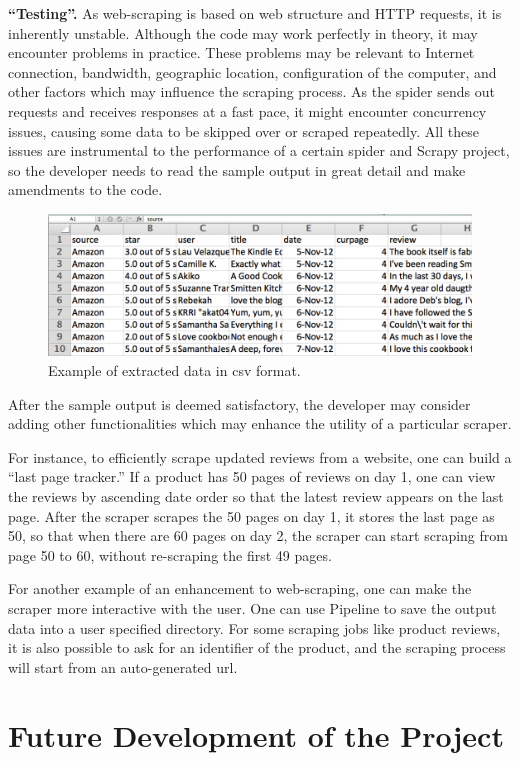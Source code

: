 \documentclass[12pt]{report}
\begin{document}
\textbf{``Testing''.} As web-scraping is based on web structure and HTTP requests, it is inherently unstable. Although the code may work perfectly in theory, it may encounter problems in practice. These problems may be relevant to Internet connection, bandwidth, geographic location, configuration of the computer, and other factors which may influence the scraping process. As the spider sends out requests and receives responses at a fast pace, it might encounter concurrency issues, causing some data to be skipped over or scraped repeatedly. All these issues are instrumental to the performance of a certain spider and Scrapy project, so the developer needs to read the sample output in great detail and make amendments to the code.
\begin{figure}[htp]
\includegraphics[width=\textwidth]{sample_output.png}
\caption[Sample csv output]
{Example of extracted data in csv format.}
\end{figure}

After the sample output is deemed satisfactory, the developer may consider adding other functionalities which may enhance the utility of a particular scraper. 

For instance, to efficiently scrape updated reviews from a website, one can build a ``last page tracker.'' If a product has 50 pages of reviews on day 1, one can view the reviews by ascending date order so that the latest review appears on the last page. After the scraper scrapes the 50 pages on day 1, it stores the last page as 50, so that when there are 60 pages on day 2, the scraper can start scraping from page 50 to 60, without re-scraping the first 49 pages.

For another example of an enhancement to web-scraping, one can make the scraper more interactive with the user. One can use Pipeline to save the output data into a user specified directory. For some scraping jobs like product reviews, it is also possible to ask for an identifier of the product, and the scraping process will start from an auto-generated url.

\chapter{Future Development of the Project}
\end{document}
